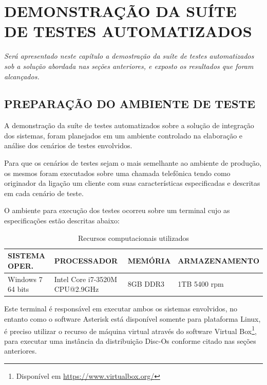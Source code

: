 \chapter[Demonstração da Suíte de Testes Automatizados]{\textbf{\uppercase{Demonstração da Suíte de Testes Automatizados}}}

\textit{Será apresentado neste capítulo a demostração da suíte de testes automatizados sob a solução abordada nas seções anteriores, e exposto os resultados que foram alcançados.}


\section{\textbf{\uppercase{Preparação do Ambiente de teste}}}

A demonstração da suíte de testes automatizados sobre a solução de integração dos sistemas, foram planejados em um ambiente controlado na elaboração e análise dos cenários de testes envolvidos. 

Para que os cenários de testes sejam o mais semelhante ao ambiente de produção, os mesmos foram executados sobre uma chamada telefônica tendo como originador da ligação um cliente com suas características especificadas e descritas em cada cenário de teste. 

O ambiente para execução dos testes ocorreu sobre um terminal cujo as especificações estão descritas abaixo:

\begin{table}[htb]
	\footnotesize
	\caption{Recursos computacionais utilizados}
	\label{tabela:recursosUtilizados}
	\begin{tabular}{|p{3.5cm}|p{3cm}|p{2cm}|p{4cm}|} \hline
		\textbf{SISTEMA OPER.} 	& \textbf{PROCESSADOR} 				& \textbf{MEMÓRIA} 	& \textbf{ARMAZENAMENTO}  \\ \hline
		Windows 7 64 bits 		& Intel Core i7-3520M CPU@2.9GHz 	& 8GB DDR3			& 1TB 5400 rpm \\ \hline
	\end{tabular}
\end{table}

Este terminal é responsável em executar ambos os sistemas envolvidos, no entanto como o software Asterisk está disponível somente para plataforma Linux, é preciso utilizar o recurso de máquina virtual através do software Virtual Box\footnote{Disponível em \url{https://www.virtualbox.org/}}, para executar uma instância da distribuição Disc-Os conforme citado nas seções anteriores.
 
